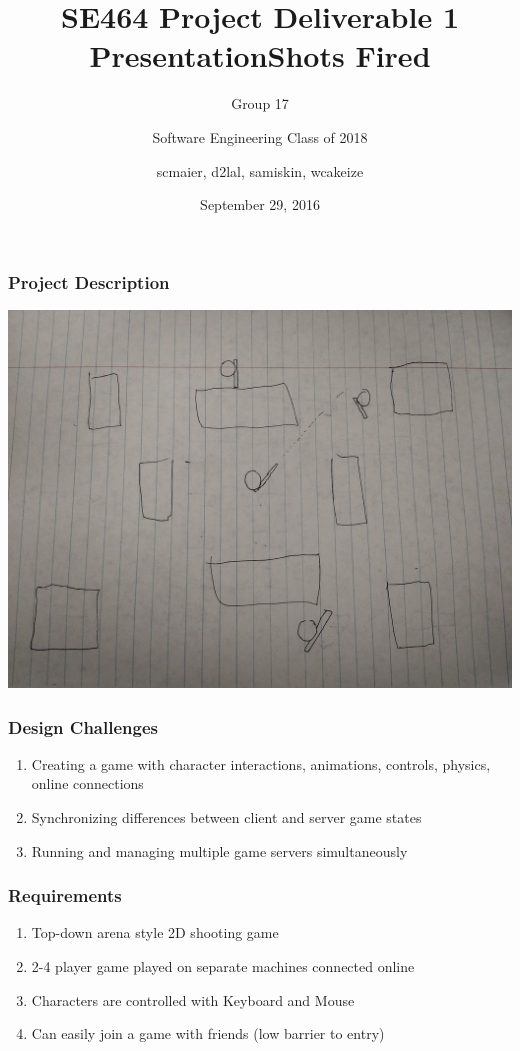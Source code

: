 \documentclass{beamer}
\title%
{SE464 Project Deliverable 1 Presentation}
\subtitle{Group 17}
\author[SE2018] %
{Software Engineering Class of 2018}
\institute[UW] %
{
  University of Waterloo
}
\date%
{September 29, 2016}
\title{Shots Fired}
\author{scmaier, d2lal, samiskin, wcakeize}
\begin{document}
\maketitle
\begin{frame}
\frametitle{Project Description}
  \begin{center}
  \includegraphics[scale=0.06]{mockup.jpg}
  \end{center}
\end{frame}

\begin{frame}
\frametitle{Design Challenges}
\begin{enumerate}
    \item Creating a game with character interactions, animations, controls, physics, online connections
    \item Synchronizing differences between client and server game states
    \item Running and managing multiple game servers simultaneously
\end{enumerate}
\end{frame}

\begin{frame}
\frametitle{Requirements}
\begin{enumerate}
  \item Top-down arena style 2D shooting game
  \item 2-4 player game played on separate machines connected online
  \item Characters are controlled with Keyboard and Mouse
  \item Can easily join a game with friends (low barrier to entry)
\end{enumerate}
\end{frame}
\end{document}
